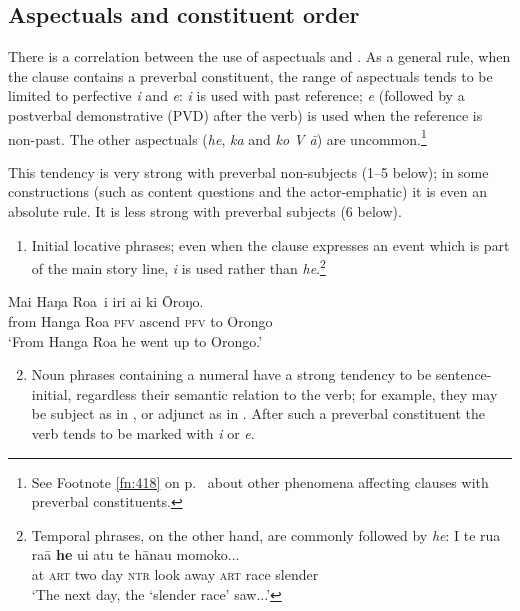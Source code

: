 \subsection{Aspectuals and constituent order}\label{sec:7.2.8}

There is a correlation between the use of aspectuals and . As a general rule, when the clause contains a preverbal constituent, the range of aspectuals tends to be limited to perfective \textit{i} and  \textit{e}: \textit{i} is used with past reference; \textit{e} (followed by a postverbal demonstrative (PVD) after the verb) is used when the reference is non-past. The other aspectuals (\textit{he}, \textit{ka} and \textit{ko V {\ꞌ}ā}) are uncommon.\footnote{\label{fn:337}See Footnote \ref{fn:418} on p.~\pageref{fn:418} about other phenomena affecting clauses with preverbal constituents.} 

This tendency is very strong with preverbal non-subjects (1–5 below); in some constructions (such as content questions and the actor-emphatic) it is even an absolute rule. It is less strong with preverbal subjects (6 below).

\begin{enumerate}
\item 
Initial locative phrases; even when the clause expresses an event which is part of the main story line, \textit{i} is used rather than \textit{he}.\footnote{\label{fn:338}Temporal phrases, on the other hand, are commonly followed by \textit{he}:
\ea
\gll 
{\ꞌ}I te rua ra{\ꞌ}ā \textbf{he} u{\ꞌ}i atu te hānau momoko...\\
   at \textsc{art} two day \textsc{ntr} look away \textsc{art} race slender \\
   \glt 
  ‘The next day, the ‘slender race’ saw...’ \textstyleExampleref{[Ley-3-06.028]}  \z }
\end{enumerate}

\ea\label{ex:7.76}
\gll {\ob}Mai Haŋa Roa\,{\cb} i iri ai ki {\ꞌ}Ōroŋo. \\
{\db}from Hanga Roa \textsc{pfv} ascend \textsc{pfv} to Orongo \\

\glt
‘From Hanga Roa he went up to Orongo.’ \textstyleExampleref{[Ley-2-02.054]}
\z

\begin{enumerate}
\setcounter{enumi}{1} 
\item 
Noun phrases containing a numeral have a strong tendency to be sentence-initial, regardless their semantic relation to the verb; for example, they may be subject as in , or adjunct as in . After such a preverbal constituent the verb tends to be marked with \textit{i} or \textit{e}. 

\end{enumerate}


